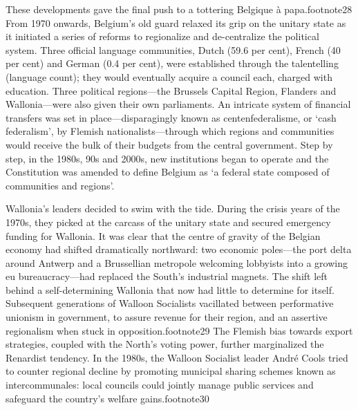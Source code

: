\documentclass[
]{book}
\begin{document}
These developments gave the final push to a tottering Belgique à papa.footnote28 From 1970 onwards, Belgium's old guard relaxed its grip on the unitary state as it initiated a series of reforms to regionalize and de-centralize the political system. Three official language communities, Dutch (59.6 per cent), French (40 per cent) and German (0.4 per cent), were established through the talentelling (language count); they would eventually acquire a council each, charged with education. Three political regions---the Brussels Capital Region, Flanders and Wallonia---were also given their own parliaments. An intricate system of financial transfers was set in place---disparagingly known as centenfederalisme, or `cash federalism', by Flemish nationalists---through which regions and communities would receive the bulk of their budgets from the central government. Step by step, in the 1980s, 90s and 2000s, new institutions began to operate and the Constitution was amended to define Belgium as `a federal state composed of communities and regions'.

Wallonia's leaders decided to swim with the tide. During the crisis years of the 1970s, they picked at the carcass of the unitary state and secured emergency funding for Wallonia. It was clear that the centre of gravity of the Belgian economy had shifted dramatically northward: two economic poles---the port delta around Antwerp and a Brussellian metropole welcoming lobbyists into a growing eu bureaucracy---had replaced the South's industrial magnets. The shift left behind a self-determining Wallonia that now had little to determine for itself. Subsequent generations of Walloon Socialists vacillated between performative unionism in government, to assure revenue for their region, and an assertive regionalism when stuck in opposition.footnote29 The Flemish bias towards export strategies, coupled with the North's voting power, further marginalized the Renardist tendency. In the 1980s, the Walloon Socialist leader André Cools tried to counter regional decline by promoting municipal sharing schemes known as intercommunales: local councils could jointly manage public services and safeguard the country's welfare gains.footnote30
\end{document}
